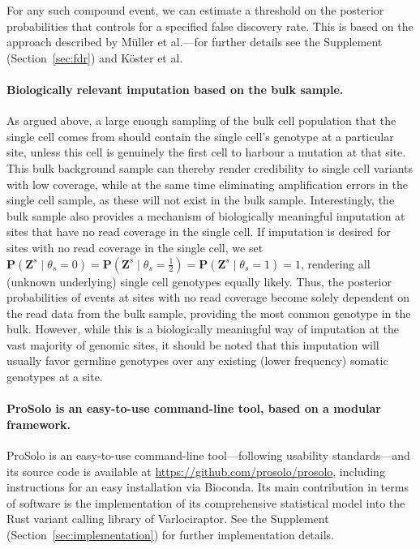 \documentclass[12pt,inline]{wlscirep}
\newcommand{\Prob}{{\mathbf{P}}}
\begin{document}
For any such compound event, we can estimate a threshold on the posterior probabilities that controls for a specified false discovery rate. 
This is based on the approach described by Müller et al.\cite{muller_optimal_2004,muller_fdr_2006}---for further details see the Supplement (Section~\ref{sec:fdr}) and Köster et al\cite{koster_varlociraptor_2020}.

\paragraph{Biologically relevant imputation based on the bulk sample.}
As argued above, a large enough sampling of the bulk cell population that the single cell comes from should contain the single cell's genotype at a particular site, unless this cell is genuinely the first cell to harbour a mutation at that site.
This bulk background sample can thereby render credibility to single cell variants with low coverage, while at the same time eliminating amplification errors in the single cell sample, as these will not exist in the bulk sample.
Interestingly, the bulk sample also provides a mechanism of biologically meaningful imputation at sites that have no read coverage in the single cell.
If imputation is desired for sites with no read coverage in the single cell, we set $\Prob(\boldsymbol{Z}^s \mid \theta_s = 0) = \Prob(\boldsymbol{Z}^s \mid \theta_s = \frac{1}{2}) = \Prob(\boldsymbol{Z}^s \mid \theta_s = 1) = 1$, rendering all (unknown underlying) single cell genotypes equally likely.
Thus, the posterior probabilities of events at sites with no read coverage become solely dependent on the read data from the bulk sample, providing the most common genotype in the bulk.
However, while this is a biologically meaningful way of imputation at the vast majority of genomic sites, it should be noted that this imputation will usually favor germline genotypes over any existing (lower frequency) somatic genotypes at a site.

\paragraph{ProSolo is an easy-to-use command-line tool, based on a modular framework.}

ProSolo is an easy-to-use command-line tool---following usability standards\cite{taschuk_ten_2017}---and its source code is available at \url{https://github.com/prosolo/prosolo}, including instructions for an easy installation via Bioconda\cite{gruning_bioconda:_2018}.
Its main contribution in terms of software is the implementation of its comprehensive statistical model into the Rust variant calling library of Varlociraptor\cite{koster_varlociraptor_2020}.
See the Supplement (Section~\ref{sec:implementation}) for further implementation details.
\end{document}
